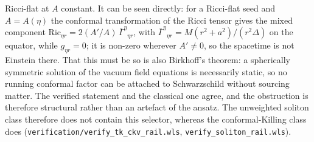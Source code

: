 \documentclass[12pt]{iopart}
\theoremstyle{plain}
\theoremstyle{definition}
\theoremstyle{remark}
\begin{document}
Ricci-flat at $A$ constant. It can be seen directly: for a Ricci-flat seed and
$A=A(\eta)$ the conformal transformation of the Ricci tensor gives the mixed component
$\mathrm{Ric}_{\eta r}=2(A'/A)\,\bar\Gamma^\eta{}_{\eta r}$, with
$\bar\Gamma^\eta{}_{\eta r}=M(r^2+a^2)/(r^2\Delta)$ on the equator, while $g_{\eta r}=0$;
it is non-zero wherever $A'\neq0$, so the spacetime is not Einstein there. That this must
be so is also Birkhoff's theorem: a
spherically symmetric solution of the vacuum field equations is necessarily
static, so no running conformal factor can be attached to Schwarzschild without
sourcing matter. The verified statement and the classical one agree, and the
obstruction is therefore structural rather than an artefact of the ansatz. The unweighted soliton class therefore does not contain this
selector, whereas the conformal-Killing class does
(\texttt{verification/verify\_tk\_ckv\_rail.wls},
\texttt{verify\_soliton\_rail.wls}).
\end{document}
